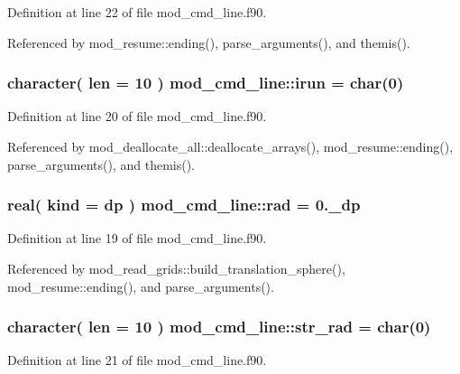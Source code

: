 Definition at line 22 of file mod\+\_\+cmd\+\_\+line.\+f90.



Referenced by mod\+\_\+resume\+::ending(), parse\+\_\+arguments(), and themis().

\subsubsection[{\texorpdfstring{irun}{irun}}]{\setlength{\rightskip}{0pt plus 5cm}character( len = 10 ) mod\+\_\+cmd\+\_\+line\+::irun = char(0)}\hypertarget{namespacemod__cmd__line_aae2bce3e1e50220133e7bd310a051881}{}\label{namespacemod__cmd__line_aae2bce3e1e50220133e7bd310a051881}


Definition at line 20 of file mod\+\_\+cmd\+\_\+line.\+f90.



Referenced by mod\+\_\+deallocate\+\_\+all\+::deallocate\+\_\+arrays(), mod\+\_\+resume\+::ending(), parse\+\_\+arguments(), and themis().

\subsubsection[{\texorpdfstring{rad}{rad}}]{\setlength{\rightskip}{0pt plus 5cm}real( kind = dp ) mod\+\_\+cmd\+\_\+line\+::rad = 0.\+\_\+dp}\hypertarget{namespacemod__cmd__line_a726e623fa552ec6109d7f0e78545afe9}{}\label{namespacemod__cmd__line_a726e623fa552ec6109d7f0e78545afe9}


Definition at line 19 of file mod\+\_\+cmd\+\_\+line.\+f90.



Referenced by mod\+\_\+read\+\_\+grids\+::build\+\_\+translation\+\_\+sphere(), mod\+\_\+resume\+::ending(), and parse\+\_\+arguments().

\subsubsection[{\texorpdfstring{str\+\_\+rad}{str_rad}}]{\setlength{\rightskip}{0pt plus 5cm}character( len = 10 ) mod\+\_\+cmd\+\_\+line\+::str\+\_\+rad = char(0)}\hypertarget{namespacemod__cmd__line_aa7def1b6cf5f62c8473902ef9fc7f307}{}\label{namespacemod__cmd__line_aa7def1b6cf5f62c8473902ef9fc7f307}


Definition at line 21 of file mod\+\_\+cmd\+\_\+line.\+f90.

